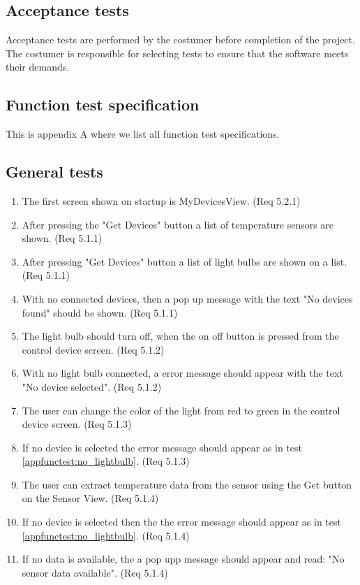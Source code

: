 \documentclass[a4paper]{article}
\begin{document}
\subsection{Acceptance tests}
Acceptance tests are performed by the costumer before completion of the project. The costumer is responsible for selecting tests to ensure that the software meets their demands.

\newpage
\begin{appendices}

\section{Function test specification} \label{appendix:section:functiontest}
This is appendix A where we list all function test specifications.

\subsection{General tests}
%
%
\begin{enumerate}[label=\bfseries Test \thesubsection.\arabic*,labelwidth=\widthof{\text{Test 10.10.10}},leftmargin=!]
    \item The first screen shown on startup is MyDevicesView. (Req 5.2.1)
    \item After pressing the "Get Devices" button a list of temperature sensors are shown. (Req 5.1.1)
    \item After pressing  "Get Devices" button a list of light bulbs are shown on a list. (Req 5.1.1)
    \item With no connected devices, then a pop up message with the text "No devices found" should be shown. (Req 5.1.1)
    \item The light bulb should turn off, when the on off button is pressed from the control device screen. (Req 5.1.2)
    \item With no light bulb connected, a error message should appear with the text "No device selected". (Req 5.1.2) \label{appfunctest:no_lightbulb}
    \item The user can change the color of the light from red to green in the control device screen. (Req 5.1.3)
    \item If no device is selected the error message should appear as in test \ref{appfunctest:no_lightbulb}. (Req 5.1.3)
    \item The user can extract temperature data from the sensor using the Get button on the Sensor View. (Req 5.1.4)
    \item If no device is selected then the the error message should appear as in test \ref{appfunctest:no_lightbulb}. (Req 5.1.4)
    \item If no data is available, the a pop upp message should appear and read: "No sensor data available". (Req 5.1.4)
\end{enumerate}


\end{appendices}
\end{document}
